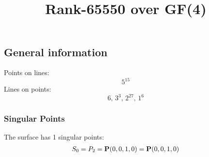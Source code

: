 \documentclass{article}
\newcommand\setTBstruts{\def\T{\rule{0pt}{2.6ex}}%
\def\B{\rule[-1.2ex]{0pt}{0pt}}}
\newcommand{\bP}{{\bf P}}
\begin{document}
 
\setTBstruts



{\allowdisplaybreaks%






\title{Rank-65550 over GF(4)}
\author{}%
\maketitle%
%
{}



\subsection*{General information}
Points on lines:
$$
5^{15}$$
Lines on points:
$$
6,\,3^3,\,2^{27},\,1^6$$
\subsubsection*{Singular Points}
The surface has 1 singular points:\\
\begin{align*}
S_{0} &= P_{2}=\bP(0, 0, 1, 0) = \bP(0, 0, 1, 0)\\
\end{align*}
}
\end{document}
